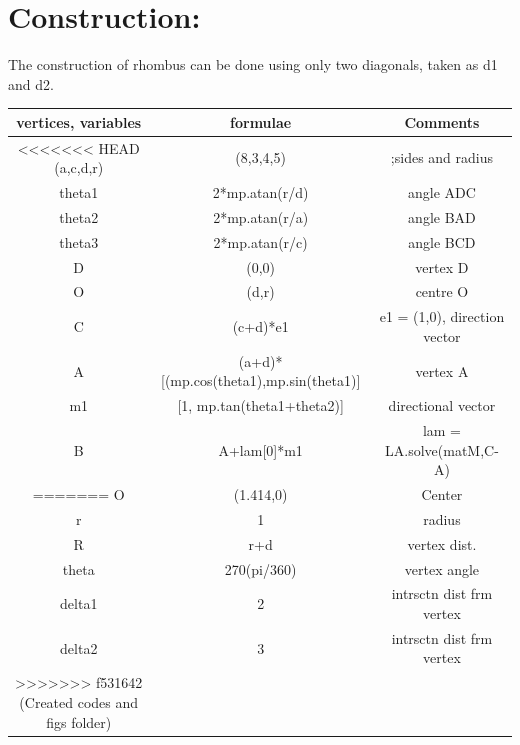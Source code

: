 \documentclass[a4paper,12pt,twocolumn]{article}
\begin{document}
\section{Construction:}
The construction of rhombus can be done using only two diagonals, taken as d1 and d2.
\begin{table}
	\centering
\setlength\extrarowheight{2pt}
	\begin{tabular}{|c|c|c|}
		\hline
		\textbf{vertices, variables} & \textbf{formulae} & \textbf{Comments}\\
		\hline
<<<<<<< HEAD
		(a,c,d,r) & (8,3,4,5) & ;sides and radius\\
		\hline
		theta1 & 2*mp.atan(r/d) & angle ADC\\
		\hline
		theta2 & 2*mp.atan(r/a) & angle BAD\\
		\hline                   
		theta3 & 2*mp.atan(r/c) & angle BCD\\
		\hline
		D & (0,0) & vertex D\\
		\hline
		O & (d,r) & centre O\\
		\hline
		C & (c+d)*e1& e1 = (1,0), direction vector\\
		\hline
		A & (a+d)*[(mp.cos(theta1),mp.sin(theta1)] & vertex A\\
		\hline
		m1 & [1, mp.tan(theta1+theta2)] & directional vector\\
		\hline
		B  &  A+lam[0]*m1 & lam = LA.solve(matM,C-A)\\
=======
		O & (1.414,0) & Center\\
		\hline
		r & 1 & radius\\
		\hline
		R & r+d & vertex dist.\\
		\hline
		theta & 270(pi/360) & vertex angle\\
		\hline
		delta1 & 2 & intrsctn dist frm vertex\\
		\hline
		delta2 & 3 & intrsctn dist frm vertex\\
>>>>>>> f531642 (Created codes and figs folder)
		\hline
	\end{tabular}
\end{table}
\end{document}
